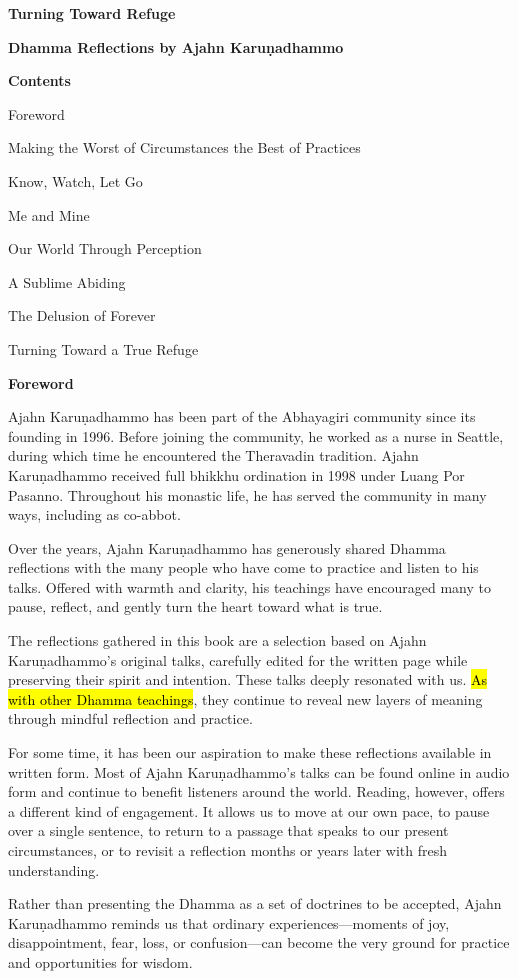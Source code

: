 \textbf{Turning Toward Refuge}

\textbf{Dhamma Reflections by Ajahn Karuṇadhammo}

\textbf{Contents}

Foreword

Making the Worst of Circumstances the Best of Practices

Know, Watch, Let Go

Me and Mine

Our World Through Perception

A Sublime Abiding

The Delusion of Forever

Turning Toward a True Refuge

\textbf{Foreword}

Ajahn Karuṇadhammo has been part of the Abhayagiri community since its founding in 1996. Before joining the community, he worked as a nurse in Seattle, during which time he encountered the Theravadin tradition. Ajahn Karuṇadhammo received full bhikkhu ordination in 1998 under Luang Por Pasanno. Throughout his monastic life, he has served the community in many ways, including as co-abbot.

Over the years, Ajahn Karuṇadhammo has generously shared Dhamma reflections with the many people who have come to practice and listen to his talks. Offered with warmth and clarity, his teachings have encouraged many to pause, reflect, and gently turn the heart toward what is true.~

The reflections gathered in this book are a selection based on Ajahn Karuṇadhammo's original talks, carefully edited for the written page while preserving their spirit and intention. These talks deeply resonated with us. \hl{As with other Dhamma teachings}, they continue to reveal new layers of meaning through mindful reflection and practice.~

For some time, it has been our aspiration to make these reflections available in written form. Most of Ajahn Karuṇadhammo's talks can be found online in audio form and continue to benefit listeners around the world. Reading, however, offers a different kind of engagement. It allows us to move at our own pace, to pause over a single sentence, to return to a passage that speaks to our present circumstances, or to revisit a reflection months or years later with fresh understanding.

Rather than presenting the Dhamma as a set of doctrines to be accepted, Ajahn Karuṇadhammo reminds us that ordinary experiences---moments of joy, disappointment, fear, loss, or confusion---can become the very ground for practice and opportunities for wisdom.~

